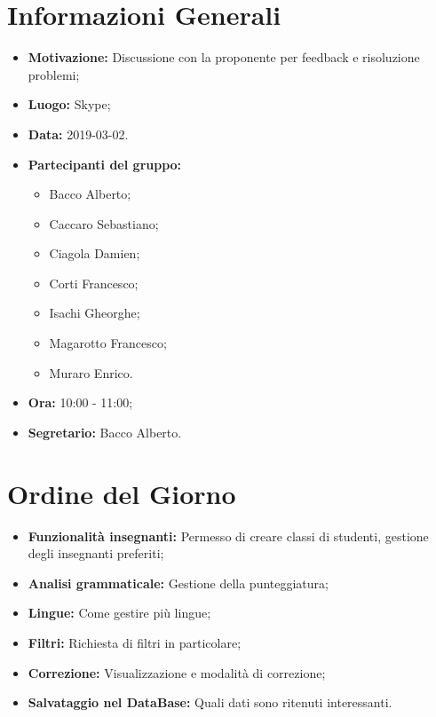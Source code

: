 \documentclass[a4paper, oneside, openany, dvipsnames, table]{article}
\begin{document}
\copertina{}


\newpage
\tableofcontents
\newpage
\section{Informazioni Generali}
\begin{itemize}
\item \textbf{Motivazione:} Discussione con la proponente per feedback e risoluzione problemi;
\item \textbf{Luogo:} Skype;
\item \textbf{Data:} 2019-03-02.
\item \textbf{Partecipanti del gruppo:} \hfill
	\begin{itemize}
	\item Bacco Alberto;
	\item Caccaro Sebastiano;
	\item Ciagola Damien;
	\item Corti Francesco;
	\item Isachi Gheorghe;
	\item Magarotto Francesco;
	\item Muraro Enrico.
	\end{itemize} 
\item \textbf{Ora:} 10:00 - 11:00;
\item \textbf{Segretario:} Bacco Alberto.
\end{itemize}

\section{Ordine del Giorno}
\begin{itemize}
	\item \textbf{Funzionalità insegnanti:} Permesso di creare classi di studenti, gestione degli insegnanti preferiti;
	\item \textbf{Analisi grammaticale:} Gestione della punteggiatura;
	\item \textbf{Lingue:} Come gestire più lingue;
	\item \textbf{Filtri:} Richiesta di filtri in particolare;
	\item \textbf{Correzione:} Visualizzazione e modalità di correzione;
	\item \textbf{Salvataggio nel DataBase:} Quali dati sono ritenuti interessanti.
\end{itemize}
\end{document}

